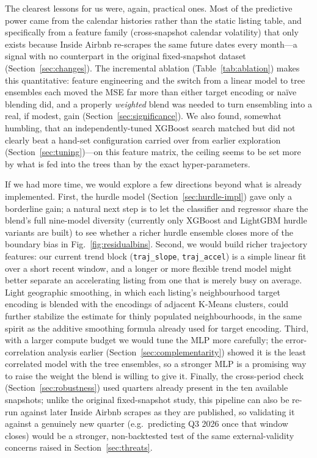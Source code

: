 \documentclass[journal]{IEEEtran}
\begin{document}
The clearest lessons for us were, again, practical ones. Most of the
predictive power came from the calendar histories rather than the static
listing table, and specifically from a feature family (cross-snapshot
calendar volatility) that only exists because Inside Airbnb re-scrapes the
same future dates every month---a signal with no counterpart in the original
fixed-snapshot dataset (Section~\ref{sec:changes}). The incremental ablation
(Table~\ref{tab:ablation}) makes this quantitative: feature engineering and the
switch from a linear model to tree ensembles each moved the MSE far more than
either target encoding or na\"ive blending did, and a properly \emph{weighted}
blend was needed to turn ensembling into a real, if modest, gain
(Section~\ref{sec:significance}). We also found, somewhat humbling, that an
independently-tuned XGBoost search matched but did not clearly beat a
hand-set configuration carried over from earlier exploration
(Section~\ref{sec:tuning})---on this feature matrix, the ceiling seems to be set
more by what is fed into the trees than by the exact hyper-parameters.

If we had more time, we would explore a few directions beyond what is already
implemented. First, the hurdle model (Section~\ref{sec:hurdle-impl}) gave only
a borderline gain; a natural next step is to let the classifier and regressor
share the blend's full nine-model diversity (currently only XGBoost and
LightGBM hurdle variants are built) to see whether a richer hurdle ensemble
closes more of the boundary bias in Fig.~\ref{fig:residualbins}. Second, we
would build richer trajectory features: our current trend block
(\texttt{traj\_slope}, \texttt{traj\_accel}) is a simple linear fit over a
short recent window, and a longer or more flexible trend model might better
separate an accelerating listing from one that is merely busy on average.
Light geographic smoothing, in which each listing's neighbourhood target
encoding is blended with the encodings of adjacent K-Means clusters, could
further stabilize the estimate for thinly populated neighbourhoods, in the same
spirit as the additive smoothing formula already used for target encoding. Third, with a
larger compute budget we would tune the MLP more carefully; the
error-correlation analysis earlier (Section~\ref{sec:complementarity}) showed it is the least
correlated model with the tree ensembles, so a stronger MLP is a promising way
to raise the weight the blend is willing to give it. Finally, the cross-period
check (Section~\ref{sec:robustness}) used quarters already present in the ten
available snapshots; unlike the original fixed-snapshot study, this pipeline
can also be re-run against later Inside Airbnb scrapes as they are published,
so validating it against a genuinely new quarter (e.g.\ predicting Q3 2026
once that window closes) would be a stronger, non-backtested test of the same
external-validity concerns raised in Section~\ref{sec:threats}.
\end{document}
